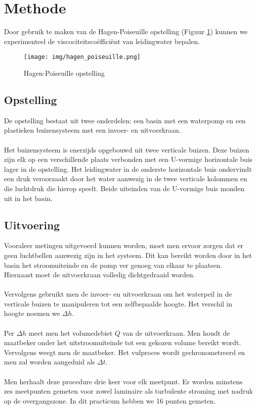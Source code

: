 \section{Methode}

Door gebruik te maken van de Hagen-Poiseuille opstelling (Figuur \ref{fig:hagen-pois}) 
kunnen we experimenteel de viscociteitsco\"effici\"ent van leidingwater bepalen. \\

\begin{figure}[h]
    \centering
    \caption{Hagen-Poiseuille opstelling}
    \texttt{[image: img/hagen\_poiseuille.png]}
    \label{fig:hagen-pois}
\end{figure}

\subsection{Opstelling}

De opstelling bestaat uit twee onderdelen: een basin
met een waterpomp en een plastieken buizensysteem met
een invoer- en uitvoerkraan.
\\ \\
Het buizensysteem is enerzijds opgebouwd uit twee verticale 
buizen. Deze buizen zijn elk op een verschillende plaats 
verbonden met een U-vormige horizontale buis lager in de opstelling.
Het leidingwater in de onderste horizontale buis ondervindt een 
druk veroorzaakt door het water aanwezig in de twee verticale
kolommen en die luchtdruk die hierop speelt. Beide uiteinden van de 
U-vormige buis monden uit in het basin.

\subsection{Uitvoering}

Vooraleer metingen uitgevoerd kunnen worden, moet men ervoor zorgen 
dat er geen luchtbellen aanwezig zijn in het systeem. 
Dit kan bereikt worden door in het basin het stroomuiteinde en de pomp
ver genoeg van elkaar te plaatsen. Hiernaast moet de uitvoerkraan 
volledig dichtgedraaid worden.
\\ \\
Vervolgens gebruikt men de invoer- en uitvoerkraan om
het waterpeil in de verticale buizen te manipuleren tot
een zelfbepaalde hoogte. Het verschil in hoogte noemen we
$\Delta h$.
\\ \\
Per $\Delta h$ meet men het volumedebiet $Q$ van de
uitvoerkraan. Men houdt de maatbeker onder het uitstroomuiteinde 
tot een gekozen volume bereikt wordt.
Vervolgens weegt men de maatbeker. Het vulproces wordt gechronometreerd
en men zal worden aangeduid als $\Delta t$.
\\ \\
Men herhaalt deze procedure drie keer voor elk meetpunt. 
Er worden minstens zes meetpunten gemeten voor zowel laminaire
als turbulente stroming met nadruk op de overgangszone. In dit practicum
hebben we 16 punten gemeten.

